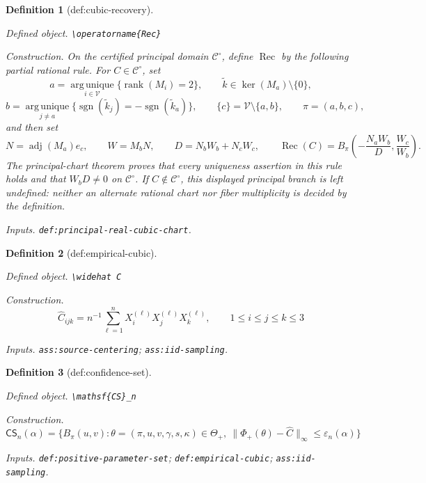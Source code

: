 \documentclass{article}
\newtheorem{definition}{Definition}
\begin{document}
\begin{definition}[def:cubic-recovery]\label{def:cubic-recovery}
\par\smallskip\noindent\emph{Defined object.} \texttt{\textbackslash{}\allowbreak{}operatorname\{Rec\}\allowbreak{}}
\par\smallskip\noindent\emph{Construction.} On the certified principal domain \(\mathcal C^{\circ}\), define \(\operatorname{Rec}\) by the following partial rational rule.  For \(C\in\mathcal C^{\circ}\), set
\[
a=\operatorname*{arg\,unique}_{i\in\mathcal V}\{\operatorname{rank}(M_i)=2\},
\qquad
\widetilde k\in\ker(M_a)\setminus\{0\},
\]
\[
b=\operatorname*{arg\,unique}_{j\ne a}
\{\operatorname{sgn}(\widetilde k_j)=-\operatorname{sgn}(\widetilde k_a)\},
\qquad
\{c\}=\mathcal V\setminus\{a,b\},
\qquad
\pi=(a,b,c),
\]
and then set
\[
N=\operatorname{adj}(M_a)e_c,
\qquad
W=M_bN,
\qquad
D=N_bW_b+N_cW_c,
\qquad
\operatorname{Rec}(C)
=B_{\pi}\!\left(-\frac{N_aW_b}{D},\frac{W_c}{W_b}\right).
\]
The principal-chart theorem proves that every uniqueness assertion in this rule holds and that \(W_bD\ne0\) on \(\mathcal C^{\circ}\).  If \(C\notin\mathcal C^{\circ}\), this displayed principal branch is left undefined: neither an alternate rational chart nor fiber multiplicity is decided by the definition.
\par\smallskip\noindent\emph{Inputs.} \texttt{def:\allowbreak{}principal-\allowbreak{}real-\allowbreak{}cubic-\allowbreak{}chart}.
\end{definition}

\begin{definition}[def:empirical-cubic]\label{def:empirical-cubic}
\par\smallskip\noindent\emph{Defined object.} \texttt{\textbackslash{}\allowbreak{}widehat C}
\par\smallskip\noindent\emph{Construction.} \[\widehat C_{ijk}=n^{-1}\sum_{\ell=1}^nX_i^{(\ell)}X_j^{(\ell)}X_k^{(\ell)},\qquad 1\le i\le j\le k\le3\]
\par\smallskip\noindent\emph{Inputs.} \texttt{ass:\allowbreak{}source-\allowbreak{}centering}; \texttt{ass:\allowbreak{}iid-\allowbreak{}sampling}.
\end{definition}

\begin{definition}[def:confidence-set]\label{def:confidence-set}
\par\smallskip\noindent\emph{Defined object.} \texttt{\textbackslash{}\allowbreak{}mathsf\{CS\}\allowbreak{}\_\allowbreak{}n}
\par\smallskip\noindent\emph{Construction.} \[\mathsf{CS}_n(\alpha)=\{B_\pi(u,v):\theta=(\pi,u,v,\gamma,s,\kappa)\in\Theta_+,\ \|\Phi_+(\theta)-\widehat C\|_\infty\le\varepsilon_n(\alpha)\}\]
\par\smallskip\noindent\emph{Inputs.} \texttt{def:\allowbreak{}positive-\allowbreak{}parameter-\allowbreak{}set}; \texttt{def:\allowbreak{}empirical-\allowbreak{}cubic}; \texttt{ass:\allowbreak{}iid-\allowbreak{}sampling}.
\end{definition}
\end{document}
